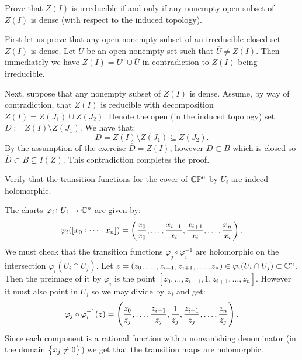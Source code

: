 \documentclass[11pt, a4paper]{article}
\begin{document}
\begin{exercise}
  Prove that $Z(I)$ is irreducible if and only if any nonempty open subset of
  $Z(I)$ is dense (with respect to the induced topology).
\end{exercise}
\begin{solution}
  First let us prove that any open nonempty subset of an irreducible closed set
  $Z(I)$ is dense.
  Let $U$ be an open nonempty set such that $\overline U \neq Z(I)$.
  Then immediately we have $Z(I) = U^c \cup \overline U$ in contradiction to $Z(I)$
  being irreducible.
  
  Next, suppose that any nonempty subset of $Z(I)$ is dense.
  Assume, by way of contradiction, that $Z(I)$ is reducible with
  decomposition $Z(I) = Z(J_1) \cup Z(J_2)$.
  Denote the open (in the induced topology) set $D := Z(I) \setminus Z(J_1)$.
  We have that:
  \[
    D = Z(I) \setminus Z(J_1) \subseteq Z(J_2).
  \]
  By the assumption of the exercise $\overline D = Z(I)$,
  however $D \subset B$ which is closed so
  $\overline D \subset B \subsetneq I(Z)$.
  This contradiction completes the proof.
\end{solution}

\begin{exercise}
  Verify that the transition functions for the cover of $\mathbb{CP}^n$
  by $U_i$ are indeed holomorphic.
\end{exercise}
\begin{solution}
  The charts $\varphi_i \colon U_i \to \mathbb{C}^n$ are given by:
  \[
    \varphi_i([x_0 : \cdots : x_n]) =
    \del{\frac{x_0}{x_0},\dots,\frac{x_{i-1}}{x_i},
      \frac{x_{i+1}}{x_i},\dots,\frac{x_n}{x_i}}.
  \]
  We must check that the transition functions $\varphi_j \circ \varphi_i^{-1}$
  are holomorphic on the intersection $\varphi_i(U_i \cap U_j)$.
  Let $z = (z_0,\dots,z_{i-1},z_{i+1},\dots,z_n) \in \varphi_i(U_i \cap U_j) \subset
  \mathbb{C}^n$.
  Then the preimage of it by $\varphi_i$ is
  the point $[z_0,\dots,z_{i-1},1,z_{i+1},\dots,z_n]$.
  However it must also point in $U_j$ so we may divide by $z_j$ and get:
  \[
    \varphi_j \circ \varphi_i^{-1} (z) =
    \del{\frac{z_0}{z_j},\dots,\frac{z_{i-1}}{z_j},\frac{1}{z_j},
    \frac{z_{i+1}}{z_j},\dots,\frac{z_n}{z_j}}.
  \]
  Since each component is a rational function with a nonvanishing
  denominator (in the domain $\left\{x_j \neq 0\right\}$) we get that
  the transition maps are holomorphic.
\end{solution}

\end{document}
